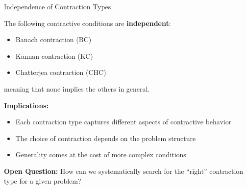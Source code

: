 \documentclass[aspectratio=169,10pt]{beamer}
\begin{document}
\begin{frame}{Independence of Contraction Types}
  \begin{theorem}[Rhoades, 1977]
    The following contractive conditions are \textbf{independent}:
    \begin{itemize}
      \item Banach contraction (BC)
      \item Kannan contraction (KC)
      \item Chatterjea contraction (CHC)
    \end{itemize}
    meaning that none implies the others in general.
  \end{theorem}

  \vspace{0.3cm}

  \textbf{Implications:}
  \begin{itemize}
    \item Each contraction type captures different aspects of contractive behavior
    \item The choice of contraction depends on the problem structure
    \item Generality comes at the cost of more complex conditions
  \end{itemize}

  \vspace{0.3cm}

  \textbf{Open Question:} How can we systematically search for the ``right'' contraction
  type for a given problem?
\end{frame}
\end{document}
